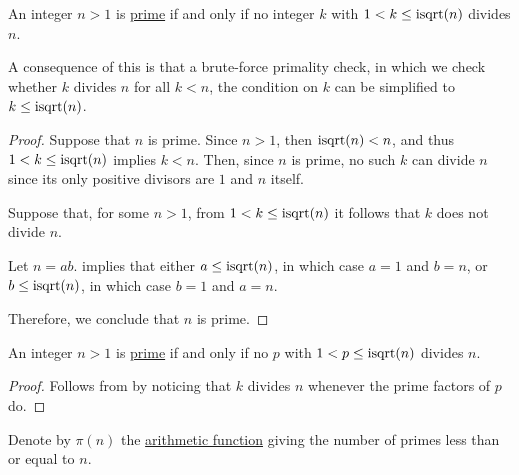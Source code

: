 \begin{proposition}\label{thm:prime_number_sqrt}
  An integer \( n > 1 \) is \hyperref[def:prime_number]{prime} if and only if no integer \( k \) with \( 1 < k \leq \op{isqrt}(n) \) divides \( n \).
\end{proposition}
\begin{comments}
  \item A consequence of this is that a brute-force primality check, in which we check whether \( k \) divides \( n \) for all \( k < n \), the condition on \( k \) can be simplified to \( k \leq \op{isqrt}(n) \).
\end{comments}
\begin{proof}
  \SufficiencySubProof Suppose that \( n \) is prime. Since \( n > 1 \), then \( \op{isqrt}(n) < n \), and thus \( 1 < k \leq \op{isqrt}(n) \) implies \( k < n \). Then, since \( n \) is prime, no such \( k \) can divide \( n \) since its only positive divisors are \( 1 \) and \( n \) itself.

  \NecessitySubProof Suppose that, for some \( n > 1 \), from \( 1 < k \leq \op{isqrt}(n) \) it follows that \( k \) does not divide \( n \).

  Let \( n = ab \).  implies that either \( a \leq \op{isqrt}(n) \), in which case \( a = 1 \) and \( b = n \), or \( b \leq \op{isqrt}(n) \), in which case \( b = 1 \) and \( a = n \).

  Therefore, we conclude that \( n \) is prime.
\end{proof}

\begin{corollary}\label{thm:prime_number_sqrt_prime}
  An integer \( n > 1 \) is \hyperref[def:prime_number]{prime} if and only if no  \( p \) with \( 1 < p \leq \op{isqrt}(n) \) divides \( n \).
\end{corollary}
\begin{proof}
  Follows from  by noticing that \( k \) divides \( n \) whenever the prime factors of \( p \) do.
\end{proof}

\begin{definition}\label{def:prime_counting_function}
  Denote by \( \pi(n) \) the \hyperref[def:arithmetic_function]{arithmetic function} giving the number of primes less than or equal to \( n \).
\end{definition}

